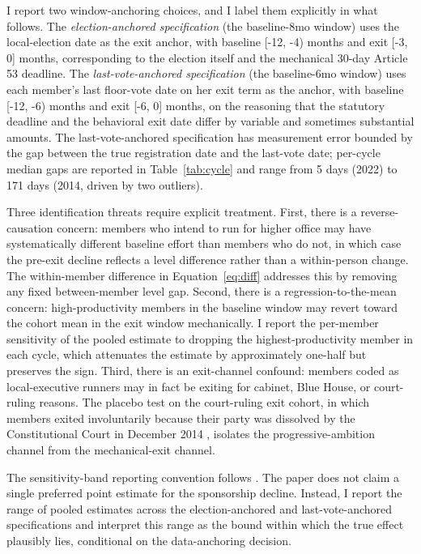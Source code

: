 \documentclass[11pt]{article}
\begin{document}
I report two window-anchoring choices, and I label them explicitly in what follows. The \emph{election-anchored specification} (the baseline-8mo window) uses the local-election date as the exit anchor, with baseline [-12, -4) months and exit [-3, 0] months, corresponding to the election itself and the mechanical 30-day Article 53 deadline. The \emph{last-vote-anchored specification} (the baseline-6mo window) uses each member's last floor-vote date on her exit term as the anchor, with baseline [-12, -6) months and exit [-6, 0] months, on the reasoning that the statutory deadline and the behavioral exit date differ by variable and sometimes substantial amounts. The last-vote-anchored specification has measurement error bounded by the gap between the true registration date and the last-vote date; per-cycle median gaps are reported in Table~\ref{tab:cycle} and range from 5 days (2022) to 171 days (2014, driven by two outliers).

Three identification threats require explicit treatment. First, there is a reverse-causation concern: members who intend to run for higher office may have systematically different baseline effort than members who do not, in which case the pre-exit decline reflects a level difference rather than a within-person change. The within-member difference in Equation~\eqref{eq:diff} addresses this by removing any fixed between-member level gap. Second, there is a regression-to-the-mean concern: high-productivity members in the baseline window may revert toward the cohort mean in the exit window mechanically. I report the per-member sensitivity of the pooled estimate to dropping the highest-productivity member in each cycle, which attenuates the estimate by approximately one-half but preserves the sign. Third, there is an exit-channel confound: members coded as local-executive runners may in fact be exiting for cabinet, Blue House, or court-ruling reasons. The placebo test on the court-ruling exit cohort, in which members exited involuntarily because their party was dissolved by the Constitutional Court in December 2014 \citep{yoon2023}, isolates the progressive-ambition channel from the mechanical-exit channel.

The sensitivity-band reporting convention follows \citet{titiunikfeher2017}. The paper does not claim a single preferred point estimate for the sponsorship decline. Instead, I report the range of pooled estimates across the election-anchored and last-vote-anchored specifications and interpret this range as the bound within which the true effect plausibly lies, conditional on the data-anchoring decision.
\end{document}
